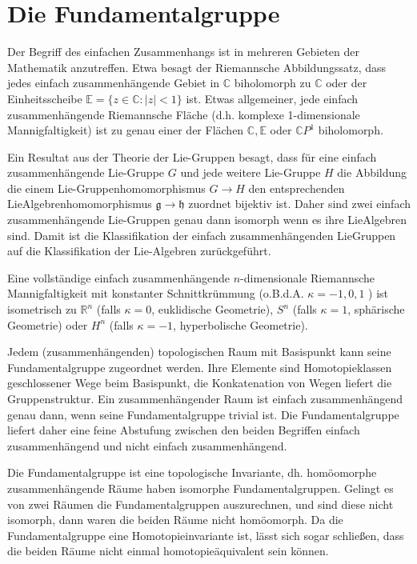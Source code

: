 \documentclass[10pt]{article}
\begin{document}
\section*{Die Fundamentalgruppe}
Der Begriff des einfachen Zusammenhangs ist in mehreren Gebieten der Mathematik anzutreffen. Etwa besagt der Riemannsche Abbildungssatz, dass jedes einfach zusammenhängende Gebiet in $\mathbb{C}$ biholomorph zu $\mathbb{C}$ oder der Einheitsscheibe $\mathbb{E}=\{z \in \mathbb{C}:|z|<1\}$ ist. Etwas allgemeiner, jede einfach zusammenhängende Riemannsche Fläche (d.h. komplexe 1-dimensionale Mannigfaltigkeit) ist zu genau einer der Flächen $\mathbb{C}, \mathbb{E}$ oder $\mathbb{C} P^{1}$ biholomorph.

Ein Resultat aus der Theorie der Lie-Gruppen besagt, dass für eine einfach zusammenhängende Lie-Gruppe $G$ und jede weitere Lie-Gruppe $H$ die Abbildung die einem Lie-Gruppenhomomorphismus $G \rightarrow H$ den entsprechenden LieAlgebrenhomomorphismus $\mathfrak{g} \rightarrow \mathfrak{h}$ zuordnet bijektiv ist. Daher sind zwei einfach zusammenhängende Lie-Gruppen genau dann isomorph wenn es ihre LieAlgebren sind. Damit ist die Klassifikation der einfach zusammenhängenden LieGruppen auf die Klassifikation der Lie-Algebren zurückgeführt.

Eine vollständige einfach zusammenhängende $n$-dimensionale Riemannsche Mannigfaltigkeit mit konstanter Schnittkrümmung (o.B.d.A. $\kappa=-1,0,1$ ) ist isometrisch zu $\mathbb{R}^{n}$ (falls $\kappa=0$, euklidische Geometrie), $S^{n}$ (falls $\kappa=1$, sphärische Geometrie) oder $H^{n}$ (falls $\kappa=-1$, hyperbolische Geometrie).

Jedem (zusammenhängenden) topologischen Raum mit Basispunkt kann seine Fundamentalgruppe zugeordnet werden. Ihre Elemente sind Homotopieklassen geschlossener Wege beim Basispunkt, die Konkatenation von Wegen liefert die Gruppenstruktur. Ein zusammenhängender Raum ist einfach zusammenhängend genau dann, wenn seine Fundamentalgruppe trivial ist. Die Fundamentalgruppe liefert daher eine feine Abstufung zwischen den beiden Begriffen einfach zusammenhängend und nicht einfach zusammenhängend.

Die Fundamentalgruppe ist eine topologische Invariante, dh. homöomorphe zusammenhängende Räume haben isomorphe Fundamentalgruppen. Gelingt es von zwei Räumen die Fundamentalgruppen auszurechnen, und sind diese nicht isomorph, dann waren die beiden Räume nicht homöomorph. Da die Fundamentalgruppe eine Homotopieinvariante ist, lässt sich sogar schließen, dass die beiden Räume nicht einmal homotopieäquivalent sein können.
\end{document}
